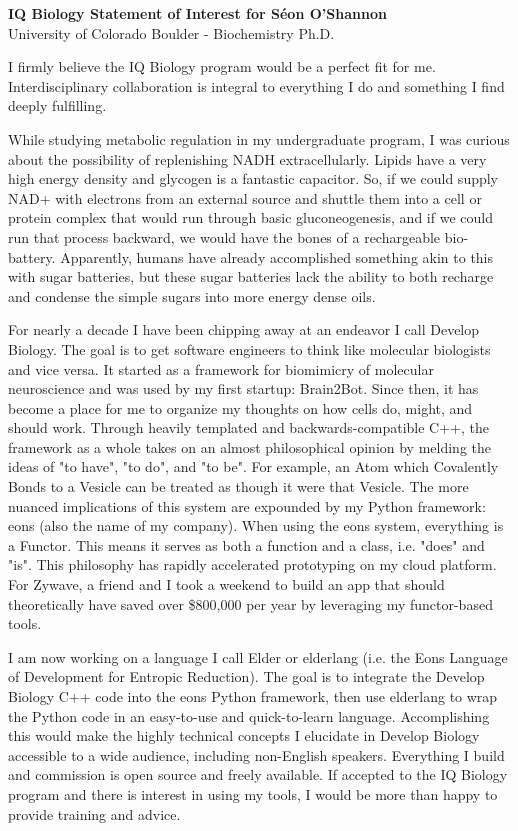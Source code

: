\documentclass[12pt]{article}
\begin{document}
\begin{center}
    \Large{\textbf{IQ Biology Statement of Interest for Séon O'Shannon}} \\
    University of Colorado Boulder - Biochemistry Ph.D.
\end{center}

\vspace{0.5cm}

I firmly believe the IQ Biology program would be a perfect fit for me. Interdisciplinary collaboration is integral to everything I do and something I find deeply fulfilling.

While studying metabolic regulation in my undergraduate program, I was curious about the possibility of replenishing NADH extracellularly. Lipids have a very high energy density and glycogen is a fantastic capacitor. So, if we could supply NAD+ with electrons from an external source and shuttle them into a cell or protein complex that would run through basic gluconeogenesis, and if we could run that process backward, we would have the bones of a rechargeable bio-battery. Apparently, humans have already accomplished something akin to this with sugar batteries, but these sugar batteries lack the ability to both recharge and condense the simple sugars into more energy dense oils.

For nearly a decade I have been chipping away at an endeavor I call Develop Biology. The goal is to get software engineers to think like molecular biologists and vice versa. It started as a framework for biomimicry of molecular neuroscience and was used by my first startup: Brain2Bot. Since then, it has become a place for me to organize my thoughts on how cells do, might, and should work. Through heavily templated and backwards-compatible C++, the framework as a whole takes on an almost philosophical opinion by melding the ideas of "to have", "to do", and "to be". For example, an Atom which Covalently Bonds to a Vesicle can be treated as though it were that Vesicle. The more nuanced implications of this system are expounded by my Python framework: eons (also the name of my company). When using the eons system, everything is a Functor. This means it serves as both a function and a class, i.e. "does" and "is". This philosophy has rapidly accelerated prototyping on my cloud platform. For Zywave, a friend and I took a weekend to build an app that should theoretically have saved over \$800,000 per year by leveraging my functor-based tools.

I am now working on a language I call Elder or elderlang (i.e. the Eons Language of Development for Entropic Reduction). The goal is to integrate the Develop Biology C++ code into the eons Python framework, then use elderlang to wrap the Python code in an easy-to-use and quick-to-learn language. Accomplishing this would make the highly technical concepts I elucidate in Develop Biology accessible to a wide audience, including non-English speakers. Everything I build and commission is open source and freely available. If accepted to the IQ Biology program and there is interest in using my tools, I would be more than happy to provide training and advice.
\end{document}
